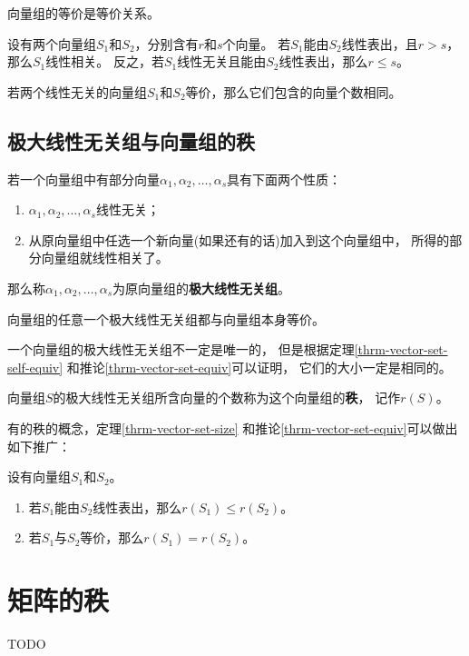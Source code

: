 \begin{remark}
  向量组的等价是等价关系。
\end{remark}

\begin{theorem} \label{thrm-vector-set-size}
  设有两个向量组$S_1$和$S_2$，分别含有$r$和$s$个向量。
  若$S_1$能由$S_2$线性表出，且$r > s$，那么$S_1$线性相关。
  反之，若$S_1$线性无关且能由$S_2$线性表出，那么$r \le s$。
\end{theorem}

\begin{corollary} \label{thrm-vector-set-equiv}
  若两个线性无关的向量组$S_1$和$S_2$等价，那么它们包含的向量个数相同。
\end{corollary}

\subsection{极大线性无关组与向量组的秩}
\begin{definition}
  若一个向量组中有部分向量$\alpha_1,\alpha_2,\dots,\alpha_s$具有下面两个性质：
  \begin{enumerate}
    \item
    $\alpha_1,\alpha_2,\dots,\alpha_s$线性无关；
    \item
    从原向量组中任选一个新向量(如果还有的话)加入到这个向量组中，
    所得的部分向量组就线性相关了。
  \end{enumerate}
  那么称$\alpha_1,\alpha_2,\dots,\alpha_s$为原向量组的\textbf{极大线性无关组}。
\end{definition}

\begin{theorem} \label{thrm-vector-set-self-equiv}
   向量组的任意一个极大线性无关组都与向量组本身等价。
\end{theorem}

\begin{remark}
  一个向量组的极大线性无关组不一定是唯一的，
  但是根据定理\ref{thrm-vector-set-self-equiv}
  和推论\ref{thrm-vector-set-equiv}可以证明，
  它们的大小一定是相同的。
\end{remark}

\begin{definition}[向量组的秩]
  向量组$S$的极大线性无关组所含向量的个数称为这个向量组的\textbf{秩}，
  记作$r(S)$。
\end{definition}

有的秩的概念，定理\ref{thrm-vector-set-size}
和推论\ref{thrm-vector-set-equiv}可以做出如下推广：
\begin{theorem}
  设有向量组$S_1$和$S_2$。
  \begin{enumerate}
    \item
    若$S_1$能由$S_2$线性表出，那么$r(S_1) \le r(S_2)$。
    \item
    若$S_1$与$S_2$等价，那么$r(S_1)=r(S_2)$。
  \end{enumerate}
\end{theorem}

\section{矩阵的秩}
TODO